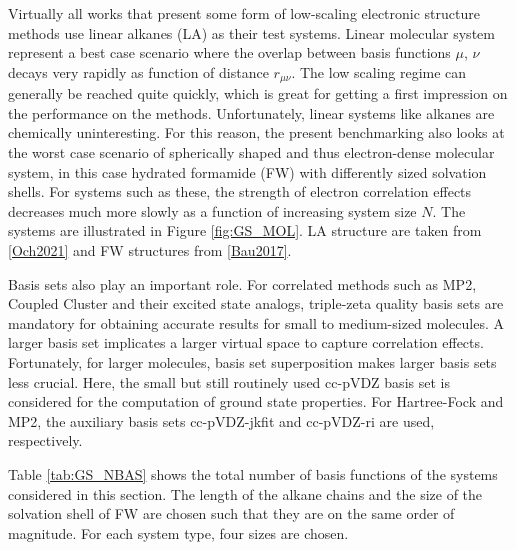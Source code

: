 Virtually all works that present some form of low-scaling electronic structure methods use linear alkanes (LA) as their test systems. Linear molecular system represent a best case scenario where the overlap between basis functions $\mu$, $\nu$ decays very rapidly as function of distance $r_{\mu\nu}$. The low scaling regime can generally be reached quite quickly, which is great for getting a first impression on the performance on the methods. Unfortunately, linear systems like alkanes are chemically uninteresting. For this reason, the present benchmarking also looks at the worst case scenario of spherically shaped and thus electron-dense molecular system, in this case hydrated formamide (FW) with differently sized solvation shells. For systems such as these, the strength of electron correlation effects decreases much more slowly as a function of increasing system size $N$. The systems are illustrated in Figure \ref{fig:GS_MOL}. LA structure are taken from \ref{Och2021} and FW structures from \ref{Bau2017}.

Basis sets also play an important role. For correlated methods such as MP2, Coupled Cluster and their excited state analogs, triple-zeta quality basis sets are mandatory for obtaining accurate results for small to medium-sized molecules. A larger basis set implicates a larger virtual space to capture correlation effects. Fortunately, for larger molecules, basis set superposition makes larger basis sets less crucial. Here, the small but still routinely used cc-pVDZ basis set is considered for the computation of ground state properties. For Hartree-Fock and MP2, the auxiliary basis sets cc-pVDZ-jkfit and cc-pVDZ-ri are used, respectively.

Table \ref{tab:GS_NBAS} shows the total number of basis functions of the systems considered in this section. The length of the alkane chains and the size of the solvation shell of FW are chosen such that they are on the same order of magnitude. For each system type, four sizes are chosen.

